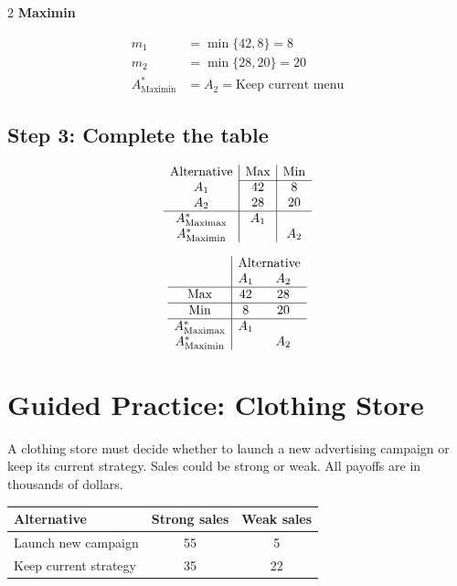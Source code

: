 \begin{multicols}{2}
		\textbf{Maximin}
		
		\[
		\begin{array}{ll}
			m_1 &= \min\{42,8\}=8 \\
			m_2 &= \min\{28,20\}=20 \\
			A^*_{\mathrm{Maximin}} &= A_2 = \textrm{Keep current menu}
		\end{array}
		\]
		
		\subsection*{Step 3: Complete the table}
		
		\[
		\begin{array}{c|c|c}
			\text{Alternative} & \text{Max} & \text{Min}\\
			\cline{2-3}
			A_1 & 42 & 8\\
			A_2 & 28 & 20\\
			\hline
			A^*_{\mathrm{Maximax}} & A_1 & \\
			A^*_{\mathrm{Maximin}} & & A_2
		\end{array}
		\]
		
		\[
		\begin{array}{c|cc}
			& \multicolumn{2}{c}{\text{Alternative}}\\
			& A_1 & A_2\\
			\hline
			\text{Max} & 42 & 28\\
			\hline
			\text{Min} & 8 & 20\\
			\hline
			A^*_{\mathrm{Maximax}} & A_1 & \\
			A^*_{\mathrm{Maximin}} & & A_2
		\end{array}
		\]
		
		\newpage
		\section{Guided Practice: Clothing Store}
		A clothing store must decide whether to launch a new advertising campaign
		or keep its current strategy. Sales could be strong or weak. All payoffs are in thousands of dollars.
		\begin{center}
			\renewcommand{\arraystretch}{1.3}
			\small
			\begin{tabular}{lcc}
				\toprule
				Alternative & Strong sales  & Weak sales  \\
				\midrule
				Launch new campaign & 55 & 5 \\
				Keep current strategy & 35 & 22 \\
				\bottomrule
			\end{tabular}
		\end{center}
		\vspace{-5mm}

\end{multicols}

